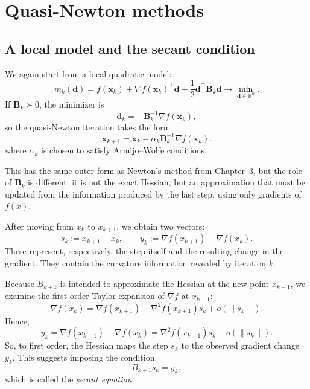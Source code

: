 \section{Quasi-Newton methods}
\label{sec:ch6-quasi-newton}

\subsection{A local model and the secant condition}
We again start from a local quadratic model:
\begin{equation}
  \label{eq:ch6-qn-model}
  m_k(\mathbf{d})
  =f(\mathbf{x}_k)+\nabla f(\mathbf{x}_k)^\top \mathbf{d}
  +\frac12 \mathbf{d}^{\top}\mathbf{B}_k\mathbf{d}
  \to \min_{\mathbf{d}\in\mathbb{R}^n}.
\end{equation}
If $\mathbf{B}_k\succ 0$, the minimizer is
\[
  \mathbf{d}_k=-\mathbf{B}_k^{-1}\nabla f(\mathbf{x}_k),
\]
so the quasi-Newton iteration takes the form
\begin{equation}
  \label{eq:ch6-qn-iteration}
  \mathbf{x}_{k+1}
  =\mathbf{x}_k-\alpha_k \mathbf{B}_k^{-1}\nabla f(\mathbf{x}_k).
\end{equation}
\noindent where $\alpha_k$ is chosen to satisfy Armijo--Wolfe conditions.

This has the same outer form as Newton's method from Chapter~3, but the role
of $\mathbf{B}_k$ is different: it is not the exact Hessian, but an
approximation that must be updated from the information produced by the last
step, using only gradients of $f(x)$.

After moving from $x_k$ to $x_{k+1}$, we obtain two vectors:
\begin{equation}
  \label{eq:ch6-sk-yk}
  s_k := x_{k+1}-x_k,
  \qquad
  y_k := \nabla f(x_{k+1})-\nabla f(x_k).
\end{equation}
These represent, respectively, the step itself and the resulting change in the
gradient. They contain the curvature information revealed by iteration $k$.

Because $B_{k+1}$ is intended to approximate the Hessian at the new point
$x_{k+1}$, we examine the first-order Taylor expansion of $\nabla f$ at
$x_{k+1}$:
\begin{equation}
  \nabla f(x_k)
  =
  \nabla f(x_{k+1})-\nabla^2 f(x_{k+1})s_k + o(\|s_k\|).
\end{equation}
Hence,
\begin{equation}
  y_k
  =
  \nabla f(x_{k+1})-\nabla f(x_k)
  =
  \nabla^2 f(x_{k+1})s_k + o(\|s_k\|).
\end{equation}
So, to first order, the Hessian maps the step $s_k$ to the observed gradient
change $y_k$. This suggests imposing the condition
\begin{equation}
  \label{eq:ch6-secant}
  B_{k+1}s_k = y_k,
\end{equation}
which is called the \emph{secant equation}.

